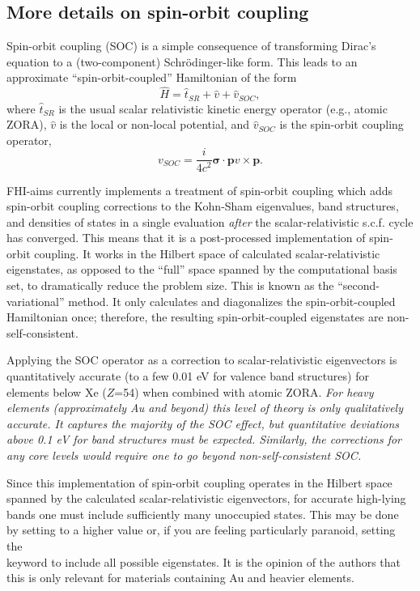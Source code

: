 \subsection*{More details on spin-orbit coupling}

Spin-orbit coupling (SOC) is a simple consequence of transforming Dirac's
equation to a (two-component) Schr\"odinger-like form. This leads to
an approximate ``spin-orbit-coupled'' Hamiltonian of the form
\begin{equation}
  \hat{H} = \hat{t}_{SR} + \hat{v} + \hat{v}_{SOC},
\end{equation}
where $\hat{t}_{SR}$ is the usual scalar relativistic kinetic energy
operator (e.g., atomic ZORA), $\hat{v}$ is the local or non-local
potential, and $\hat{v}_{SOC}$ is the spin-orbit coupling operator,
\begin{equation}
	v_{SOC}=\frac{i}{4c^{2}}\bm{\sigma} \cdot \bm{p} v \times \bm{p}.
\end{equation}

FHI-aims currently implements a treatment of spin-orbit coupling which 
adds spin-orbit coupling corrections to the Kohn-Sham eigenvalues, band 
structures, and densities of states in a single evaluation \emph{after} 
the scalar-relativistic s.c.f. cycle has converged.  This means that it 
is a post-processed implementation of spin-orbit coupling.  It works in 
the Hilbert space of calculated scalar-relativistic eigenstates, as 
opposed to the ``full'' space spanned by the computational basis set, 
to dramatically reduce the problem size.  This is known as the 
``second-variational'' method.  It only calculates and diagonalizes the 
spin-orbit-coupled Hamiltonian once;  therefore, the resulting 
spin-orbit-coupled eigenstates are non-self-consistent.

Applying the SOC operator as a correction to scalar-relativistic
eigenvectors is quantitatively accurate (to a few 0.01 eV for valence band
structures) for elements below Xe ($Z$=54) when combined with atomic ZORA.
\emph{For heavy elements (approximately Au and beyond) this level of
theory is only qualitatively accurate.  It captures the majority of the 
SOC effect, but quantitative deviations above 0.1 eV for band structures 
must be expected. Similarly, the corrections for any core levels would 
require one to go beyond non-self-consistent SOC.}

Since this implementation of spin-orbit coupling operates in the Hilbert 
space spanned by the calculated scalar-relativistic eigenvectors, for 
accurate high-lying bands one must include sufficiently many unoccupied 
states.  This may be done by setting  to a higher
value or, if you are feeling particularly paranoid, setting the \\ 
 keyword to include all possible 
eigenstates.  It is the opinion of the authors that this is only relevant 
for materials containing Au and heavier elements.

